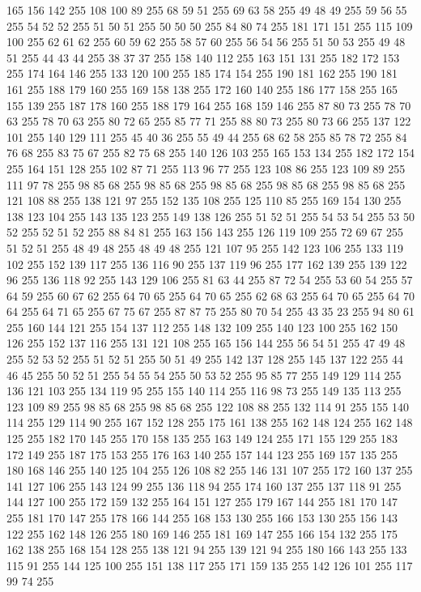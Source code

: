 165 156 142 255 108 100 89 255 68 59 51 255 69 63 58 255 49 48 49 255 59 56 55 255 54 52 52 255 51 50 51 255 50 50 50 255 84 80 74 255 181 171 151 255 115 109 100 255 62 61 62 255 60 59 62 255 58 57 60 255 56 54 56 255 51 50 53 255 49 48 51 255 44 43 44 255 38 37 37 255 158 140 112 255 163 151 131 255 182 172 153 255 174 164 146 255 133 120 100 255 185 174 154 255 190 181 162 255 190 181 161 255 188 179 160 255 169 158 138 255 172 160 140 255 186 177 158 255 165 155 139 255 187 178 160 255 188 179 164 255 168 159 146 255 87 80 73 255 78 70 63 255 78 70 63 255 80 72 65 255 85 77 71 255 88 80 73 255 80 73 66 255 137 122 101 255 140 129 111 255 45 40 36 255 55 49 44 255 68 62 58 255 85 78 72 255 84 76 68 255 83 75 67 255 82 75 68 255 140 126 103 255 165 153 134 255 182 172 154 255 164 151 128 255 102 87 71 255 113 96 77 255 123 108 86 255 123 109 89 255 111 97 78 255 98 85 68 255 98 85 68 255 98 85 68 255
98 85 68 255 98 85 68 255 121 108 88 255 138 121 97 255 152 135 108 255 125 110 85 255 169 154 130 255 138 123 104 255 143 135 123 255 149 138 126 255 51 52 51 255 54 53 54 255 53 50 52 255 52 51 52 255 88 84 81 255 163 156 143 255 126 119 109 255 72 69 67 255 51 52 51 255 48 49 48 255 48 49 48 255 121 107 95 255 142 123 106 255 133 119 102 255 152 139 117 255 136 116 90 255 137 119 96 255 177 162 139 255 139 122 96 255 136 118 92 255 143 129 106 255 81 63 44 255 87 72 54 255 53 60 54 255 57 64 59 255 60 67 62 255 64 70 65 255 64 70 65 255 62 68 63 255 64 70 65 255 64 70 64 255 64 71 65 255 67 75 67 255 87 87 75 255 80 70 54 255 43 35 23 255 94 80 61 255 160 144 121 255 154 137 112 255 148 132 109 255 140 123 100 255 162 150 126 255 152 137 116 255 131 121 108 255 165 156 144 255 56 54 51 255 47 49 48 255 52 53 52 255 51 52 51 255 50 51 49 255 142 137 128 255 145 137 122 255 44 46 45 255 50 52 51 255
54 55 54 255 50 53 52 255 95 85 77 255 149 129 114 255 136 121 103 255 134 119 95 255 155 140 114 255 116 98 73 255 149 135 113 255 123 109 89 255 98 85 68 255 98 85 68 255 122 108 88 255 132 114 91 255 155 140 114 255 129 114 90 255 167 152 128 255 175 161 138 255 162 148 124 255 162 148 125 255 182 170 145 255 170 158 135 255 163 149 124 255 171 155 129 255 183 172 149 255 187 175 153 255 176 163 140 255 157 144 123 255 169 157 135 255 180 168 146 255 140 125 104 255 126 108 82 255 146 131 107 255 172 160 137 255 141 127 106 255 143 124 99 255 136 118 94 255 174 160 137 255 137 118 91 255 144 127 100 255 172 159 132 255 164 151 127 255 179 167 144 255 181 170 147 255 181 170 147 255 178 166 144 255 168 153 130 255 166 153 130 255 156 143 122 255 162 148 126 255 180 169 146 255 181 169 147 255 166 154 132 255 175 162 138 255 168 154 128 255 138 121 94 255 139 121 94 255 180 166 143 255 133 115 91 255 144 125 100 255 151 138 117 255 171 159 135 255 142 126 101 255 117 99 74 255
